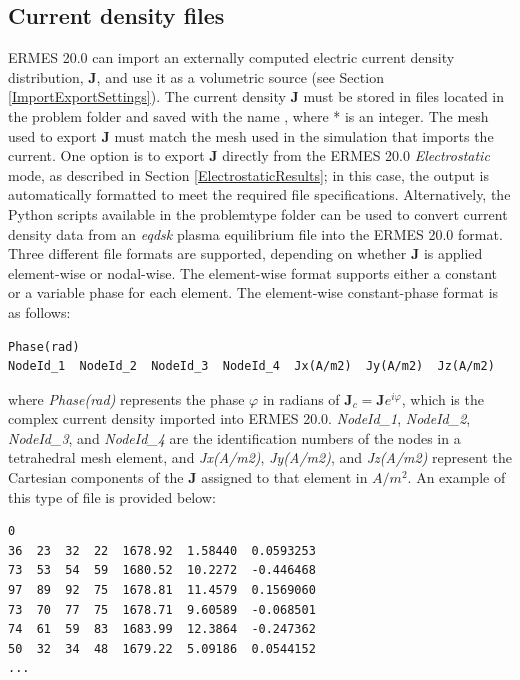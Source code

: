 \subsection{Current density files}

ERMES 20.0 can import an externally computed electric current density distribution, $\mathbf{J}$, and use it as a volumetric source (see Section \ref{ImportExportSettings}). The current density $\mathbf{J}$ must be stored in files located in the problem folder  and saved with the name , where * is an integer. The mesh used to export $\mathbf{J}$ must match the mesh used in the simulation that imports the current. One option is to export $\mathbf{J}$ directly from the ERMES 20.0 \textit{Electrostatic} mode, as described in Section \ref{ElectrostaticResults}; in this case, the output is automatically formatted to meet the required file specifications. Alternatively, the Python scripts available in the problemtype folder  can be used to convert current density data from an \textit{eqdsk} plasma equilibrium file into the ERMES 20.0 format. Three different file formats are supported, depending on whether $\mathbf{J}$ is applied element-wise or nodal-wise. The element-wise format supports either a constant or a variable phase for each element. The element-wise constant-phase format is as follows:
\begin{small}\begin{lstlisting}
Phase(rad)
NodeId_1  NodeId_2  NodeId_3  NodeId_4  Jx(A/m2)  Jy(A/m2)  Jz(A/m2)
\end{lstlisting}\end{small} 
where \textit{Phase(rad)} represents the phase $\varphi$ in radians of $\mathbf{J}_{c} = \mathbf{J}e^{i\varphi}$, which is the complex current density imported into ERMES 20.0. \textit{NodeId\_1}, \textit{NodeId\_2}, \textit{NodeId\_3}, and  \textit{NodeId\_4} are the identification numbers of the nodes in a tetrahedral mesh element, and \textit{Jx(A/m2)}, \textit{Jy(A/m2)}, and \textit{Jz(A/m2)} represent the Cartesian components of the \textbf{J} assigned to that element in $A/m^{2}$. An example of this type of file is provided below:
\begin{small}\begin{lstlisting}
0
36  23  32  22  1678.92  1.58440  0.0593253
73  53  54  59  1680.52  10.2272  -0.446468
97  89  92  75  1678.81  11.4579  0.1569060
73  70  77  75  1678.71  9.60589  -0.068501
74  61  59  83  1683.99  12.3864  -0.247362
50  32  34  48  1679.22  5.09186  0.0544152
...
\end{lstlisting}\end{small}
